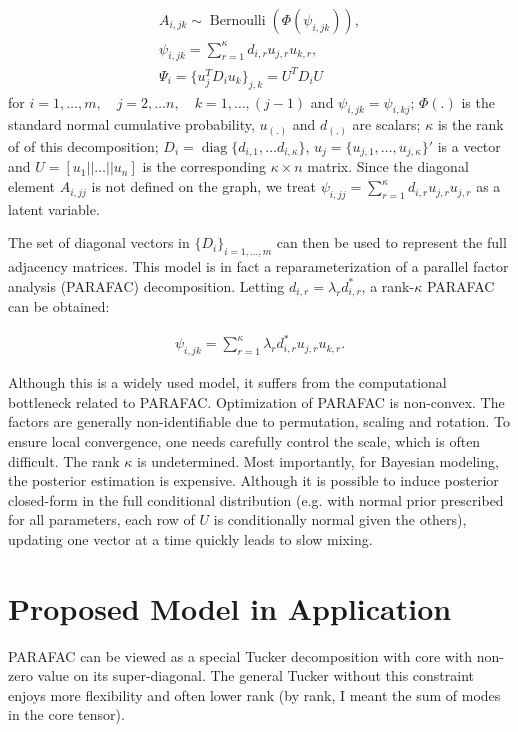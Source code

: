 \documentclass[10pt]{article}
\newcommand{\be}{\begin{equation}\begin{aligned}}
\newcommand{\ee}{\end{aligned}\end{equation}}
\DeclareMathOperator{\Bern}{Bernoulli}
\DeclareMathOperator{\diag}{diag}
\begin{document}
\be
\label{parafac_over_i}
A_{i,jk} \sim \Bern(\Phi( \psi_{i,jk})),\\
\psi_{i,jk}=\sum_{r=1}^{\kappa} d_{i,r} u_{j,r} u_{k,r},\\
\Psi_{i}= \{ u_{j}^T  D_{i} u_{k}\}_{j,k} = U^T D_iU
\ee
for $i=1,\ldots,m, \quad  j=2,\ldots n, \quad k=1,\ldots,(j-1)$ and $\psi_{i,jk}=\psi_{i,kj}$; $\Phi(.)$ is the standard normal cumulative probability, $u_{(.)}$ and $d_{(.)}$ are scalars; $\kappa$ is the rank of of this decomposition; $D_{i}=\diag\{d_{i,1},\ldots d_{i,\kappa}\}$, $u_j = \{ u_{j,1},\ldots, u_{j,\kappa}\}'$ is a vector and $U=[ u_1 || \ldots || u_n ]$ is the corresponding $ \kappa \times n$ matrix. Since the diagonal element $A_{i,jj}$ is not defined on the graph, we treat $\psi_{i,jj}=\sum_{r=1}^{\kappa} d_{i,r} u_{j,r} u_{j,r}$ as a latent variable.

The set of diagonal vectors in $\{D_i\}_{i=1,\ldots, m}$ can then be used to represent the full adjacency matrices. This model is in fact a reparameterization of a parallel factor analysis (PARAFAC) decomposition. Letting  $d_{i,r} = \lambda_r  d^*_{i,r}$, a rank-$\kappa$ PARAFAC can be obtained:

\be
\psi_{i,jk}=\sum_{r=1}^{\kappa} \lambda_r  d^*_{i,r} u_{j,r} u_{k,r}.
\ee

Although this is a widely used model, it suffers from the computational bottleneck related to PARAFAC. Optimization of PARAFAC is non-convex. The factors are generally non-identifiable due to permutation, scaling and rotation. To ensure local convergence, one needs carefully control the scale, which is often difficult. The rank $\kappa$ is undetermined. Most importantly, for Bayesian modeling, the posterior estimation is expensive. Although it is possible to induce posterior closed-form in the full conditional distribution (e.g. with  normal prior prescribed for all parameters, each row of $U$ is conditionally normal given the others), updating one vector at a time quickly leads to slow mixing.

\section{Proposed Model in Application}

PARAFAC can be viewed as  a special Tucker decomposition with core with non-zero value on its super-diagonal. The general Tucker  without this constraint enjoys more flexibility and often lower rank (by rank, I meant the sum of modes in the core tensor).
\end{document}
